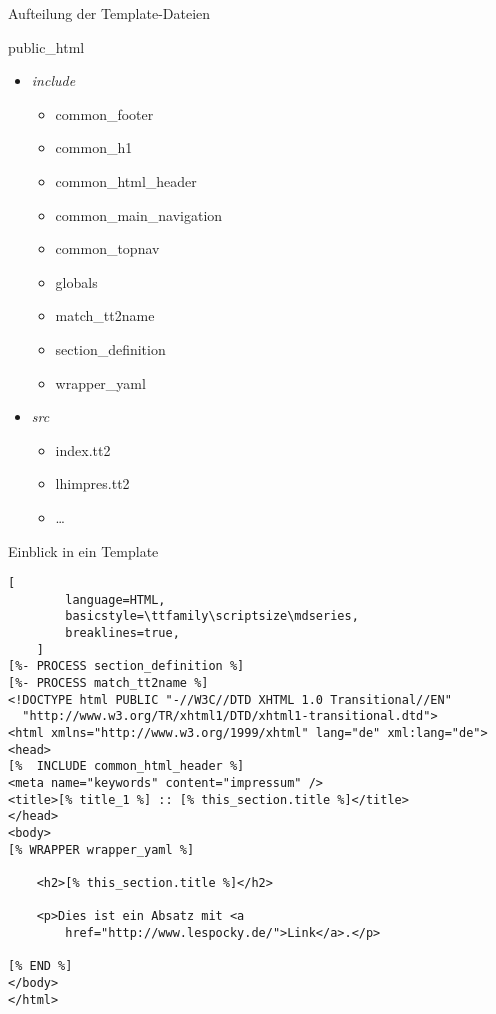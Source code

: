 \documentclass{beamer}
\begin{document}
\begin{frame}{Aufteilung der Template-Dateien}
    \begin{block}{public\_html}
        \begin{itemize}
            \item \emph{include}
                \begin{itemize}
                    \item common\_footer
                    \item common\_h1
                    \item common\_html\_header
                    \item common\_main\_navigation
                    \item common\_topnav
                    \item globals
                    \item match\_tt2name
                    \item section\_definition
                    \item wrapper\_yaml
                \end{itemize}
            \item \emph{src}
                \begin{itemize}
                    \item index.tt2
                    \item lhimpres.tt2
                    \item \dots
                \end{itemize}
        \end{itemize}
    \end{block}
\end{frame}

\begin{frame}[fragile]{Einblick in ein Template}
    \begin{lstlisting}[
        language=HTML,
        basicstyle=\ttfamily\scriptsize\mdseries,
        breaklines=true,
    ]
[%- PROCESS section_definition %]
[%- PROCESS match_tt2name %]
<!DOCTYPE html PUBLIC "-//W3C//DTD XHTML 1.0 Transitional//EN"
  "http://www.w3.org/TR/xhtml1/DTD/xhtml1-transitional.dtd">
<html xmlns="http://www.w3.org/1999/xhtml" lang="de" xml:lang="de">
<head>
[%  INCLUDE common_html_header %]
<meta name="keywords" content="impressum" />
<title>[% title_1 %] :: [% this_section.title %]</title>
</head>
<body>
[% WRAPPER wrapper_yaml %]

    <h2>[% this_section.title %]</h2>

    <p>Dies ist ein Absatz mit <a 
        href="http://www.lespocky.de/">Link</a>.</p>

[% END %]
</body>
</html>
    \end{lstlisting}
\end{frame}
\end{document}
